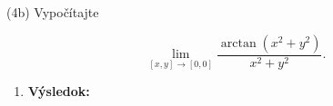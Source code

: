 \pr (4b)
Vypočítajte

$$
\lim\limits_{
[x,y]\rightarrow [0,0]}
\frac{\arctan(x^2+y^2)}{x^2+y^2}.
$$

\begin{enumerate}
\item[]\textbf{Výsledok:}\gr
\end{enumerate}
